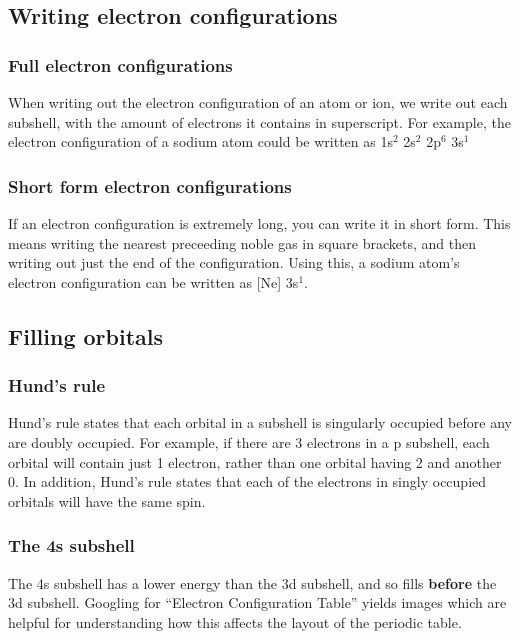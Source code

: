 \subsection{Writing electron configurations}
\subsubsection{Full electron configurations}
When writing out the electron configuration of an atom or ion, we write out each subshell, with the amount of electrons it contains in superscript. For example, the electron configuration of a sodium atom could be written as 1s$^2$ 2s$^2$ 2p$^6$ 3s$^1$
\subsubsection{Short form electron configurations}
If an electron configuration is extremely long, you can write it in short form. This means writing the nearest preceeding noble gas in square brackets, and then writing out just the end of the configuration. Using this, a sodium atom's electron configuration can be written as [Ne] 3s$^1$.

\subsection{Filling orbitals}
\subsubsection{Hund's rule}
Hund's rule states that each orbital in a subshell is singularly occupied before any are doubly occupied. For example, if there are 3 electrons in a p subshell, each orbital will contain just 1 electron, rather than one orbital having 2 and another 0. In addition, Hund's rule states that each of the electrons in singly occupied orbitals will have the same spin.
\subsubsection{The 4s subshell}
The 4s subshell has a lower energy than the 3d subshell, and so fills \textbf{before} the 3d subshell. Googling for ``Electron Configuration Table'' yields images which are helpful for understanding how this affects the layout of the periodic table.
